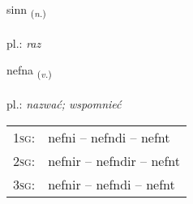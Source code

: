 \documentclass[frontgrid, backgrid]{flacards}\usepackage[]{graphicx}\usepackage[]{xcolor}
\begin{document}
\renewcommand{\blhead}{\vskip5pt {\small\bfseries\footnotesize Nafnorð | Noun }}
\renewcommand{\bcfoot}{\vskip5pt \hspace{2pt}{\small\bfseries\footnotesize 1K}}


{sinn \small{\textsubscript{(\textit{n.})}} \\[1ex] %
\textphonetic{[sɪn]} \\
pl.: \emph{raz} \\  [2ex]
\renewcommand*{\arraystretch}{0.8}
}

\renewcommand{\flhead}{\vskip5pt \fboxsep=0pt {\small\bfseries\footnotesize Sagnorð | Verb}}
\renewcommand{\fcfoot}{\vskip5pt \fboxsep=0pt \hspace{2pt}{\small\bfseries\footnotesize 1K}}

\renewcommand{\blhead}{\vskip5pt {\small\bfseries\footnotesize Sagnorð | Verb }}
\renewcommand{\bcfoot}{\vskip5pt \hspace{2pt}{\small\bfseries\footnotesize 1K}}


{nefna \small{\textsubscript{(\textit{v.})}} \\[1ex] %
\textphonetic{[nɛpna]} \\
pl.: \emph{nazwać; wspomnieć} \\  [2ex]
\renewcommand*{\arraystretch}{0.8}
\begin{tabular}{p{1cm}l}
\textsc{1sg}: & nefni -- nefndi -- nefnt \\ 
\textsc{2sg}: & nefnir -- nefndir -- nefnt \\ 
\textsc{3sg}: & nefnir -- nefndi -- nefnt \\ 
\end{tabular}
}

\renewcommand{\flhead}{\vskip5pt \fboxsep=0pt {\small\bfseries\footnotesize Nafnorð | Noun}}
\renewcommand{\fcfoot}{\vskip5pt \fboxsep=0pt \hspace{2pt}{\small\bfseries\footnotesize 1K}}
\end{document}
